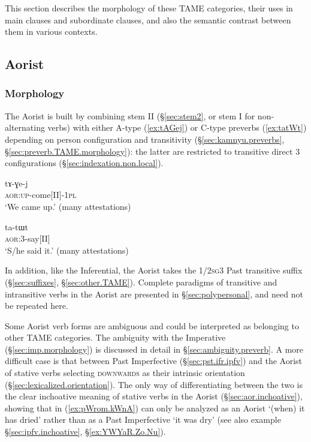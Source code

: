 This section describes the morphology of these TAME categories, their uses in main clauses and subordinate clauses, and also the semantic contrast between them in various contexts.


\subsection{Aorist}    \label{sec:aor}
\subsubsection{Morphology} \label{sec:aor.morphology}
The Aorist is built by combining stem II (§\ref{sec:stem2}, or stem I for non-alternating verbs) with either A-type (\ref{ex:tAGej}) or C-type preverbs (\ref{ex:tatWt}) depending on person configuration and transitivity (§\ref{sec:kamnyu.preverbs}, §\ref{sec:preverb.TAME.morphology}): the latter are restricted to transitive direct 3\flobv{} configurations (§\ref{sec:indexation.non.local}).

\begin{exe}
\ex \label{ex:tAGej}
 \gll tɤ-ɣe-j \\
\textsc{aor}:\textsc{up}-come[II]-\textsc{1pl} \\
\glt `We came up.' (many attestations)
\end{exe}

\begin{exe}
\ex \label{ex:tatWt}
 \gll ta-tɯt \\
\textsc{aor}:3\flobv{}-say[II]  \\
\glt `S/he said it.' (many attestations)
\end{exe}

In addition, like the Inferential, the Aorist takes the 1/2\textsc{sg}\fl{}3 Past transitive suffix  (§\ref{sec:suffixes}, §\ref{sec:other.TAME}). Complete paradigms of transitive and intransitive verbs in the Aorist are presented in §\ref{sec:polypersonal}, and need not be repeated here.

Some Aorist verb forms are ambiguous and could be interpreted as belonging to other TAME categories. The ambiguity with the Imperative (§\ref{sec:imp.morphology}) is discussed in detail in §\ref{sec:ambiguity.preverb}. A more difficult case is that between Past Imperfective  (§\ref{sec:pst.ifr.ipfv}) and the Aorist of stative verbs selecting \textsc{downwards} as their intrinsic orientation (§\ref{sec:lexicalized.orientation}). The only way of differentiating between the two is the clear inchoative meaning of stative verbs in the Aorist (§\ref{sec:aor.inchoative}), showing that  in (\ref{ex:pWrom.kWnA}) can only be analyzed as an Aorist `(when) it has dried' rather than as a Past Imperfective `it was dry' (see also example §\ref{sec:ipfv.inchoative},  §\ref{ex:YWYaR.Zo.Nu}).

